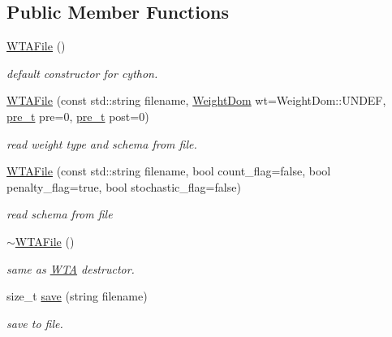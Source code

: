 \subsection*{Public Member Functions}
\begin{DoxyCompactItemize}
\item 
\mbox{\label{classWTAFile_afc385786a0b36382ab366c91a8b9ce0b}} 
\mbox{\hyperlink{classWTAFile_afc385786a0b36382ab366c91a8b9ce0b}{W\+T\+A\+File}} ()
\begin{DoxyCompactList}\small\item\em default constructor for cython. \end{DoxyCompactList}\item 
\mbox{\hyperlink{classWTAFile_a0c65f030a8df8bdb8eed5c261908e6bb}{W\+T\+A\+File}} (const std\+::string filename, \mbox{\hyperlink{group__general_gae07bdce6f4896785ead3b815ca6ab560}{Weight\+Dom}} wt=Weight\+Dom\+::\+U\+N\+D\+EF, \mbox{\hyperlink{group__general_ga092fe8b972dfa977c2a0886720a7731e}{pre\+\_\+t}} pre=0, \mbox{\hyperlink{group__general_ga092fe8b972dfa977c2a0886720a7731e}{pre\+\_\+t}} post=0)
\begin{DoxyCompactList}\small\item\em read weight type and schema from file. \end{DoxyCompactList}\item 
\mbox{\hyperlink{classWTAFile_a1d76575338801558fc75759aa90261b9}{W\+T\+A\+File}} (const std\+::string filename, bool count\+\_\+flag=false, bool penalty\+\_\+flag=true, bool stochastic\+\_\+flag=false)
\begin{DoxyCompactList}\small\item\em read schema from file \end{DoxyCompactList}\item 
\mbox{\label{classWTAFile_acd30482d9409353945f35dbaf3fd05f1}} 
\mbox{\hyperlink{classWTAFile_acd30482d9409353945f35dbaf3fd05f1}{$\sim$\+W\+T\+A\+File}} ()
\begin{DoxyCompactList}\small\item\em same as \mbox{\hyperlink{classWTA}{W\+TA}} destructor. \end{DoxyCompactList}\item 
\mbox{\label{classWTAFile_a01b3ef064d42d02129f4fc202935e805}} 
size\+\_\+t \mbox{\hyperlink{classWTAFile_a01b3ef064d42d02129f4fc202935e805}{save}} (string filename)
\begin{DoxyCompactList}\small\item\em save to file. \end{DoxyCompactList}\end{DoxyCompactItemize}

